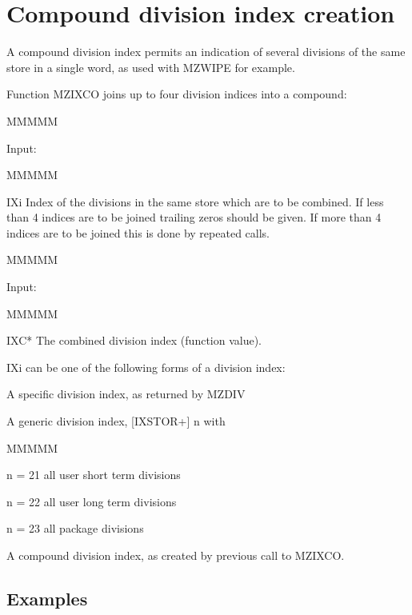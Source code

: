 \section{Compound division index creation}
\par A compound division index permits an indication of several divisions
of the same store in a single word,
as used with MZWIPE for example.
\par Function MZIXCO joins up to four division indices into a compound:
\begin{DL}{MMMMM}
\item[Input:
]
\begin{DL}{MMMMM}
\item[IXi
]Index of the divisions in the same store which are to be
combined.
\newline If less than 4 indices are to be joined trailing zeros
should be given.
\newline If more than 4 indices are to be joined this is done by
repeated calls.
\end{DL}
\end{DL}
\begin{DL}{MMMMM}
\item[Input:
]
\begin{DL}{MMMMM}
\item[IXC*
]The combined division index (function value).
\end{DL}
\end{DL}
\par IXi can be one of the following forms of a division index:
\begin{OL}
\item A specific division index, as returned by MZDIV
\item A generic division index, [IXSTOR+] n with
\begin{DL}{MMMMM}
\item[n = 21
]all user short term divisions
\item[n = 22
]all user long  term divisions
\item[n = 23
]all package divisions
\end{DL}
\item A compound division index, as created by previous call to MZIXCO.
\end{OL}
\subsection{Examples}
